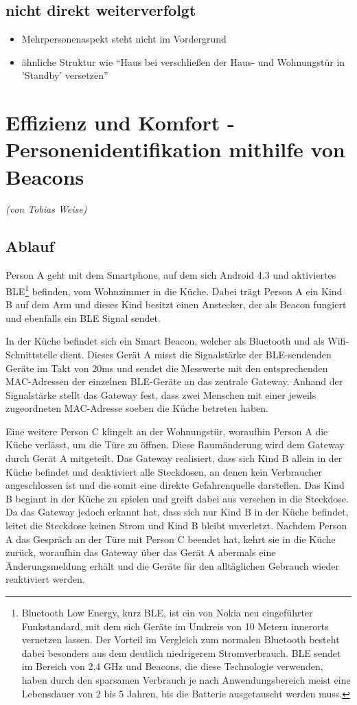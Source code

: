 \subsection{nicht direkt weiterverfolgt}
\begin{itemize}
	\item Mehrpersonenaspekt steht nicht im Vordergrund
	\item ähnliche Struktur wie "`Haus bei verschließen der Haus- und Wohnungstür in 'Standby' versetzen"'
\end{itemize}


\section{Effizienz und Komfort - Personenidentifikation mithilfe von Beacons}
\emph{(von Tobias Weise)}

\subsection{Ablauf}
Person A geht mit dem Smartphone, auf dem sich Android 4.3 und aktiviertes BLE\footnote{
	Bluetooth Low Energy, kurz BLE, ist ein von Nokia neu eingeführter Funkstandard, mit dem sich Geräte im Umkreis von 10 Metern innerorts vernetzen lassen. Der Vorteil im Vergleich zum normalen Bluetooth besteht dabei besonders aus dem deutlich niedrigerem Stromverbrauch. BLE sendet im Bereich von 2,4 GHz und Beacons, die diese Technologie verwenden, haben durch den sparsamen Verbrauch je nach Anwendungsbereich meist eine Lebensdauer von 2 bis 5 Jahren, bis die Batterie ausgetauscht werden muss.} 
befinden, vom Wohnzimmer in die Küche. Dabei trägt Person A ein Kind B auf dem Arm und dieses Kind besitzt einen Anstecker, der als Beacon fungiert und ebenfalls ein BLE Signal sendet.

In der Küche befindet sich ein Smart Beacon, welcher als Bluetooth und als Wifi-Schnittstelle dient. Dieses Gerät A misst die Signalstärke der BLE-sendenden Geräte im Takt von 20ms und sendet die Messwerte mit den entsprechenden MAC-Adressen der einzelnen BLE-Geräte an das zentrale Gateway. Anhand der Signalstärke stellt das Gateway fest, dass zwei Menschen mit einer jeweils zugeordneten MAC-Adresse soeben die Küche betreten haben.

Eine weitere Person C klingelt an der Wohnungstür, woraufhin Person A die Küche verlässt, um die Türe zu öffnen. Diese Raumänderung wird dem Gateway durch Gerät A mitgeteilt. Das Gateway realisiert, dass sich Kind B allein in der Küche befindet und deaktiviert alle Steckdosen, an denen kein Verbraucher angeschlossen ist und die somit eine direkte Gefahrenquelle darstellen. 
Das Kind B beginnt in der Küche zu spielen und greift dabei aus versehen in die Steckdose. Da das Gateway jedoch erkannt hat, dass sich nur Kind B in der Küche befindet, leitet die Steckdose keinen Strom und Kind B bleibt unverletzt.
Nachdem Person A das Gespräch an der Türe mit Person C beendet hat, kehrt sie in die Küche zurück, woraufhin das Gateway über das Gerät A abermals eine Änderungsmeldung erhält und die Geräte für den alltäglichen Gebrauch wieder reaktiviert werden.

